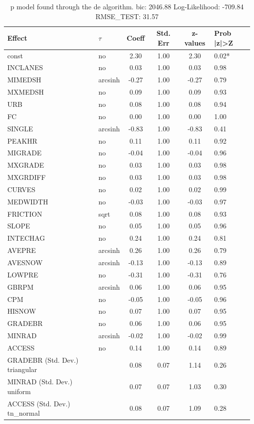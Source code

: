 \begin{table}
	\caption{p model found through the de algorithm. bic: 2046.88 Log-Likelihood: -709.84 RMSE_TEST: 31.57}
	\begin{center}
		\begin{tabular}{|l|l|c|c|c|l|}
			\hline
			Effect & $\tau$ & Coeff & Std. Err & z-values & Prob |z|>Z \\
			\hline
			const & no & 2.30 & 1.00 & 2.30 & 0.02* \\
			\hline
			INCLANES & no & 0.03 & 1.00 & 0.03 & 0.98 \\
			\hline
			MIMEDSH & arcsinh & -0.27 & 1.00 & -0.27 & 0.79 \\
			\hline
			MXMEDSH & no & 0.09 & 1.00 & 0.09 & 0.93 \\
			\hline
			URB & no & 0.08 & 1.00 & 0.08 & 0.94 \\
			\hline
			FC & no & 0.00 & 1.00 & 0.00 & 1.00 \\
			\hline
			SINGLE & arcsinh & -0.83 & 1.00 & -0.83 & 0.41 \\
			\hline
			PEAKHR & no & 0.11 & 1.00 & 0.11 & 0.92 \\
			\hline
			MIGRADE & no & -0.04 & 1.00 & -0.04 & 0.96 \\
			\hline
			MXGRADE & no & 0.03 & 1.00 & 0.03 & 0.98 \\
			\hline
			MXGRDIFF & no & 0.03 & 1.00 & 0.03 & 0.98 \\
			\hline
			CURVES & no & 0.02 & 1.00 & 0.02 & 0.99 \\
			\hline
			MEDWIDTH & no & -0.03 & 1.00 & -0.03 & 0.97 \\
			\hline
			FRICTION & sqrt & 0.08 & 1.00 & 0.08 & 0.93 \\
			\hline
			SLOPE & no & 0.05 & 1.00 & 0.05 & 0.96 \\
			\hline
			INTECHAG & no & 0.24 & 1.00 & 0.24 & 0.81 \\
			\hline
			AVEPRE & arcsinh & 0.26 & 1.00 & 0.26 & 0.79 \\
			\hline
			AVESNOW & arcsinh & -0.13 & 1.00 & -0.13 & 0.89 \\
			\hline
			LOWPRE & no & -0.31 & 1.00 & -0.31 & 0.76 \\
			\hline
			GBRPM & arcsinh & 0.06 & 1.00 & 0.06 & 0.95 \\
			\hline
			CPM & no & -0.05 & 1.00 & -0.05 & 0.96 \\
			\hline
			HISNOW & no & 0.07 & 1.00 & 0.07 & 0.95 \\
			\hline
			GRADEBR & no & 0.06 & 1.00 & 0.06 & 0.95 \\
			\hline
			MINRAD & arcsinh & -0.02 & 1.00 & -0.02 & 0.99 \\
			\hline
			ACCESS & no & 0.14 & 1.00 & 0.14 & 0.89 \\
			\hline
			GRADEBR (Std. Dev.) triangular &  & 0.08 & 0.07 & 1.14 & 0.26 \\
			\hline
			MINRAD (Std. Dev.) uniform &  & 0.07 & 0.07 & 1.03 & 0.30 \\
			\hline
			ACCESS (Std. Dev.) tn_normal &  & 0.08 & 0.07 & 1.09 & 0.28 \\
			\hline
		\end{tabular}
	\end{center}
\end{table}